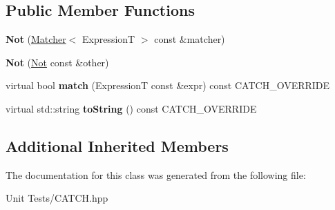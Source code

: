 \subsection*{Public Member Functions}
\begin{DoxyCompactItemize}
\item 
{\bfseries Not} (\hyperlink{structCatch_1_1Matchers_1_1Impl_1_1Matcher}{Matcher}$<$ ExpressionT $>$ const \&matcher)\hypertarget{classCatch_1_1Matchers_1_1Impl_1_1Generic_1_1Not_a9b99e3ce49c1a16931708b67c312f204}{}\label{classCatch_1_1Matchers_1_1Impl_1_1Generic_1_1Not_a9b99e3ce49c1a16931708b67c312f204}

\item 
{\bfseries Not} (\hyperlink{classCatch_1_1Matchers_1_1Impl_1_1Generic_1_1Not}{Not} const \&other)\hypertarget{classCatch_1_1Matchers_1_1Impl_1_1Generic_1_1Not_a46eccbbaeec259d3536aa2a29f95208f}{}\label{classCatch_1_1Matchers_1_1Impl_1_1Generic_1_1Not_a46eccbbaeec259d3536aa2a29f95208f}

\item 
virtual bool {\bfseries match} (ExpressionT const \&expr) const C\+A\+T\+C\+H\+\_\+\+O\+V\+E\+R\+R\+I\+DE\hypertarget{classCatch_1_1Matchers_1_1Impl_1_1Generic_1_1Not_a18c49fc6fb73a42d54650dafc18c7db1}{}\label{classCatch_1_1Matchers_1_1Impl_1_1Generic_1_1Not_a18c49fc6fb73a42d54650dafc18c7db1}

\item 
virtual std\+::string {\bfseries to\+String} () const C\+A\+T\+C\+H\+\_\+\+O\+V\+E\+R\+R\+I\+DE\hypertarget{classCatch_1_1Matchers_1_1Impl_1_1Generic_1_1Not_ab970a4a6e58a987451e0b0e0e60a0bff}{}\label{classCatch_1_1Matchers_1_1Impl_1_1Generic_1_1Not_ab970a4a6e58a987451e0b0e0e60a0bff}

\end{DoxyCompactItemize}
\subsection*{Additional Inherited Members}


The documentation for this class was generated from the following file\+:\begin{DoxyCompactItemize}
\item 
Unit Tests/C\+A\+T\+C\+H.\+hpp\end{DoxyCompactItemize}

